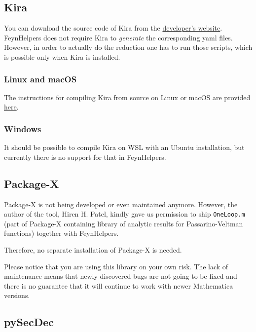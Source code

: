 \documentclass[../FeynHelpersManual.tex]{subfiles}
\begin{document}
\hypertarget{kira}{%
\subsection{Kira}\label{kira}}

You can download the source code of Kira from the
\href{https://gitlab.com/kira-pyred/kira}{developer's website}.
FeynHelpers does not require Kira to \emph{generate} the corresponding
yaml files. However, in order to actually do the reduction one has to
run those scripts, which is possible only when Kira is installed.

\hypertarget{linux-and-macos}{%
\subsubsection{Linux and macOS}\label{linux-and-macos}}

The instructions for compiling Kira from source on Linux or macOS are
provided \href{https://gitlab.com/kira-pyred/kira}{here}.

\hypertarget{windows-2}{%
\subsubsection{Windows}\label{windows-2}}

It should be possible to compile Kira on WSL with an Ubuntu
installation, but currently there is no support for that in FeynHelpers.

\hypertarget{package-x}{%
\subsection{Package-X}\label{package-x}}

Package-X is not being developed or even maintained anymore. However,
the author of the tool, Hiren H. Patel, kindly gave us permission to
ship \texttt{OneLoop.m} (part of Package-X containing library of
analytic results for Passarino-Veltman functions) together with
FeynHelpers.

Therefore, no separate installation of Package-X is needed.

Please notice that you are using this library on your own risk. The lack
of maintenance means that newly discovered bugs are not going to be
fixed and there is no guarantee that it will continue to work with newer
Mathematica versions.

\hypertarget{pysecdec}{%
\subsection{pySecDec}\label{pysecdec}}
\end{document}
